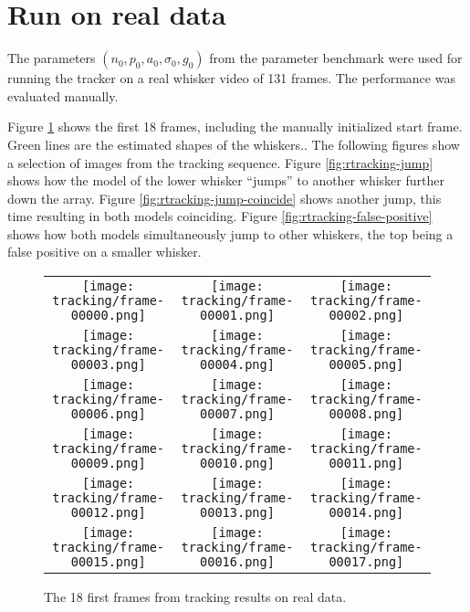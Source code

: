 \section{Run on real data}

The parameters $\left(n_0, p_0, a_0, \sigma_0, g_0\right)$ from the
parameter benchmark were used for running the tracker on a real
whisker video of 131 frames. The performance was evaluated manually.

Figure \ref{fig:rtracking} shows the first 18 frames, including the
manually initialized start frame. Green lines are the estimated shapes
of the whiskers.. The following figures show a selection of images
from the tracking sequence. Figure \ref{fig:rtracking-jump} shows how
the model of the lower whisker ``jumps'' to another whisker further
down the array. Figure \ref{fig:rtracking-jump-coincide} shows another
jump, this time resulting in both models coinciding. Figure
\ref{fig:rtracking-false-positive} shows how both models
simultaneously jump to other whiskers, the top being a false positive
on a smaller whisker.

\begin{figure}[p]
  \centering
  \begin{tabular}{ccc}
    \texttt{[image: tracking/frame-00000.png]} &
    \texttt{[image: tracking/frame-00001.png]} &
    \texttt{[image: tracking/frame-00002.png]}\\
    \texttt{[image: tracking/frame-00003.png]} &
    \texttt{[image: tracking/frame-00004.png]} &
    \texttt{[image: tracking/frame-00005.png]}\\
    \texttt{[image: tracking/frame-00006.png]} &
    \texttt{[image: tracking/frame-00007.png]} &
    \texttt{[image: tracking/frame-00008.png]}\\
    \texttt{[image: tracking/frame-00009.png]} &
    \texttt{[image: tracking/frame-00010.png]} &
    \texttt{[image: tracking/frame-00011.png]}\\
    \texttt{[image: tracking/frame-00012.png]} &
    \texttt{[image: tracking/frame-00013.png]} &
    \texttt{[image: tracking/frame-00014.png]}\\
    \texttt{[image: tracking/frame-00015.png]} &
    \texttt{[image: tracking/frame-00016.png]} &
    \texttt{[image: tracking/frame-00017.png]}\\
  \end{tabular}
  \caption{The 18 first frames from tracking results on real data.}
  \label{fig:rtracking}
\end{figure}


